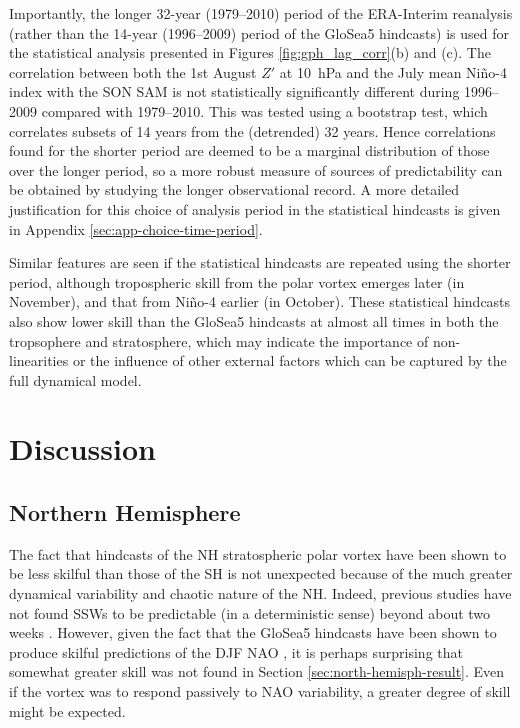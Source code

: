 Importantly, the longer 32-year (1979--2010) period of the ERA-Interim
reanalysis (rather than the 14-year (1996--2009) period of the GloSea5
hindcasts) is used for the statistical analysis presented in Figures
\ref{fig:gph_lag_corr}(b) and (c). The correlation between both the 1st August
$Z'$ at 10~hPa and the July mean Ni\~no-4 index with the SON SAM is not
statistically significantly different during 1996--2009 compared with
1979--2010. This was tested using a bootstrap test, which correlates subsets of
14 years from the (detrended) 32 years. Hence correlations found for the shorter
period are deemed to be a marginal distribution of those over the longer period,
so a more robust measure of sources of predictability can be obtained by
studying the longer observational record. A more detailed justification for this
choice of analysis period in the statistical hindcasts is given in Appendix
\ref{sec:app-choice-time-period}.

Similar features are seen if the statistical hindcasts are repeated using the
shorter period, although tropospheric skill from the polar vortex emerges later
(in November), and that from Ni\~no-4 earlier (in October). These statistical
hindcasts also show lower skill than the GloSea5 hindcasts at almost all times
in both the tropsophere and stratosphere, which may indicate the importance of
non-linearities or the influence of other external factors which can be captured
by the full dynamical model.

\section{Discussion}
\label{sec:seas-discussion}
\subsection{Northern Hemisphere}

The fact that hindcasts of the NH stratospheric polar vortex have been shown to
be less skilful than those of the SH is not unexpected because of the much
greater dynamical variability and chaotic nature of the NH. Indeed, previous
studies have not found SSWs to be predictable (in a deterministic sense) beyond
about two weeks \citep{Marshall2010,Taguchi2014}. However, given the fact that
the GloSea5 hindcasts have been shown to produce skilful predictions of the DJF
NAO \citep{Scaife2013}, it is perhaps surprising that somewhat greater skill was
not found in Section \ref{sec:north-hemisph-result}. Even if the vortex was to
respond passively to NAO variability, a greater degree of skill might be
expected.

